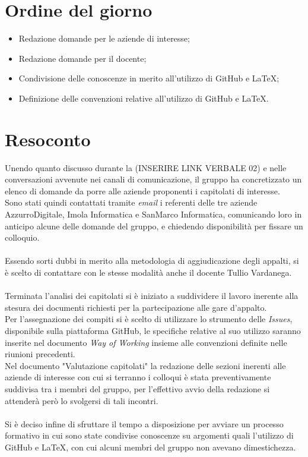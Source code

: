 \section{Ordine del giorno}
\begin{itemize}
    \item Redazione domande per le aziende di interesse;
    \item Redazione domande per il docente;
    \item Condivisione delle conoscenze in merito all'utilizzo di GitHub e LaTeX;
    \item Definizione delle convenzioni relative all'utilizzo di GitHub e LaTeX.
\end{itemize}

\section{Resoconto}
Unendo quanto discusso durante la (INSERIRE LINK VERBALE 02) e nelle conversazioni avvenute nei canali di comunicazione, il gruppo ha concretizzato un elenco di domande da porre alle aziende proponenti i capitolati di interesse.\\
\noindent
Sono stati quindi contattati tramite \textit{email} i referenti delle tre aziende AzzurroDigitale, Imola Informatica e SanMarco Informatica, comunicando loro in anticipo alcune delle domande del gruppo, e chiedendo disponibilità per fissare un colloquio.\\
\noindent
\\
Essendo sorti dubbi in merito alla metodologia di aggiudicazione degli appalti, si è scelto di contattare con le stesse modalità anche il docente Tullio Vardanega.\\
\noindent
\\
Terminata l'analisi dei capitolati si è iniziato a suddividere il lavoro inerente alla stesura dei documenti richiesti per la partecipazione alle gare d'appalto.\\
\noindent
Per l'assegnazione dei compiti si è scelto di utilizzare lo strumento delle \textit{Issues}, disponibile sulla piattaforma GitHub, le specifiche relative al suo utilizzo saranno inserite nel documento \textit{Way of Working} insieme alle convenzioni definite nelle riunioni precedenti.\\
\noindent
Nel documento "Valutazione capitolati" la redazione delle sezioni inerenti alle aziende di interesse con cui si terranno i colloqui è stata preventivamente suddivisa tra i membri del gruppo, per l'effettivo avvio della redazione si attenderà però lo svolgersi di tali incontri.\\
\noindent
\\
Si è deciso infine di sfruttare il tempo a disposizione per avviare un processo formativo in cui sono state condivise conoscenze su argomenti quali l'utilizzo di GitHub e LaTeX, con cui alcuni membri del gruppo non avevano dimestichezza.

